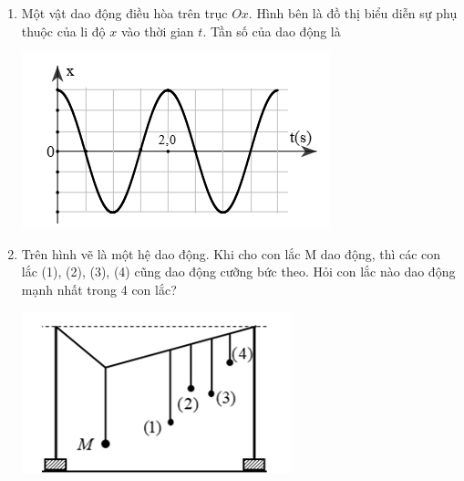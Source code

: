 \begin{enumerate}[label=\bfseries Câu \arabic*:]
\item Một vật dao động điều hòa trên trục $Ox$. Hình bên là đồ thị biểu diễn sự phụ thuộc của li độ $x$ vào thời gian $t$. Tần số của dao động là 
\begin{center}
	\includegraphics[width=0.4\linewidth]{../figs/D11-3-3}
\end{center}

\item Trên hình vẽ là một hệ dao động. Khi cho con lắc M dao động, thì các con lắc (1), (2), (3), (4) cũng dao động cưỡng bức theo. Hỏi con lắc nào dao động mạnh nhất trong 4 con lắc?
\begin{center}
	\includegraphics[width=0.4\linewidth]{../figs/D11-3-8}
\end{center}


\end{enumerate}
